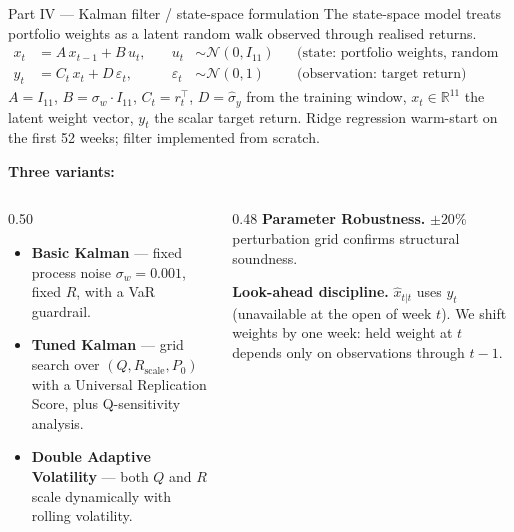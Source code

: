 \documentclass[10pt, aspectratio=169]{beamer}
\begin{document}
\begin{frame}{Part IV --- Kalman filter / state-space formulation}
	{\footnotesize The state-space model treats portfolio weights as a latent random walk observed through realised returns.}
	\[
		\begin{aligned}
			x_t & = A\, x_{t-1} + B\, u_t, \quad         & u_t           & \sim \mathcal{N}(0, I_{11}) &  & \text{(state: portfolio weights, random walk)} \\
			y_t & = C_t\, x_t + D\, \varepsilon_t, \quad & \varepsilon_t & \sim \mathcal{N}(0, 1)      &  & \text{(observation: target return)}
		\end{aligned}
	\]
	{\footnotesize $A = I_{11}$,\; $B = \sigma_w \cdot I_{11}$,\; $C_t = r_t^\top$,\; $D = \hat{\sigma}_y$ from the training window,\;
		$x_t \in \mathbb{R}^{11}$ the latent weight vector,\; $y_t$ the scalar target return.
		Ridge regression warm-start on the first 52 weeks; filter implemented from scratch.}

	\vspace{2pt}
	\textbf{Three variants:}
	\begin{columns}[T]
		\begin{column}{0.50\textwidth}
			\footnotesize
			\begin{itemize}\setlength{\itemsep}{1pt}
				\item \textbf{Basic Kalman} --- fixed process noise $\sigma_w = 0.001$, fixed $R$, with a VaR guardrail.
				\item \textbf{Tuned Kalman} --- grid search over $(Q, R_{\text{scale}}, P_0)$ with a Universal Replication Score, plus Q-sensitivity analysis.
				\item \textbf{Double Adaptive Volatility} --- both $Q$ and $R$ scale dynamically with rolling volatility.
			\end{itemize}
		\end{column}
		\begin{column}{0.48\textwidth}
			\footnotesize
			\textbf{Parameter Robustness.} $\pm20\%$ perturbation grid confirms structural soundness.

			\vspace{2pt}
			\textbf{Look-ahead discipline.} $\hat{x}_{t|t}$ uses $y_t$ (unavailable at the open of week $t$). We shift weights by one week: held weight at $t$ depends only on observations through $t{-}1$.
		\end{column}
	\end{columns}
\end{frame}
\end{document}
